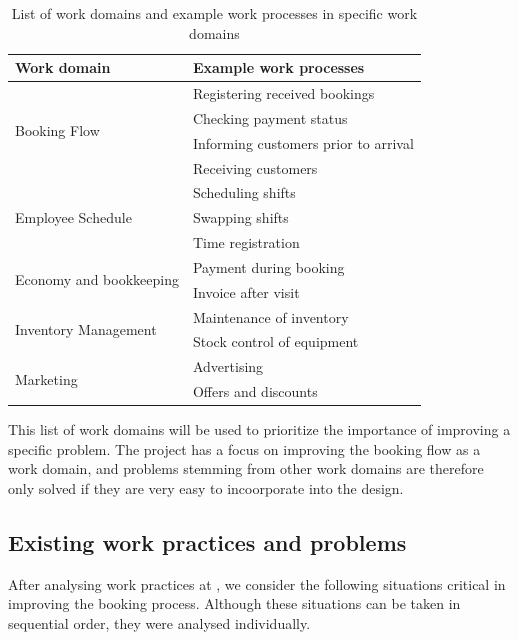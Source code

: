 \begin{table}[H]
    \centering
\begin{tabular}{ |l|l| }
        \hline
        Work domain & Example work processes \\ \hline
        \multirow{4}{*}{Booking Flow} 
            & Registering received bookings \\
            & Checking payment status \\
            & Informing customers prior to arrival \\
            & Receiving customers \\
        \hline
        \multirow{3}{*}{Employee Schedule} 
            & Scheduling shifts \\
            & Swapping shifts \\
            & Time registration \\
        \hline
        \multirow{2}{*}{Economy and bookkeeping} 
            & Payment during booking \\
            & Invoice after visit \\
        \hline
        \multirow{2}{*}{Inventory Management} 
            & Maintenance of inventory \\
            & Stock control of equipment \\
        \hline
        \multirow{2}{*}{Marketing} 
            & Advertising \\
            & Offers and discounts \\
        \hline
\end{tabular}
\caption{List of work domains and example work processes in specific work domains}
\label{table:workdomain}
\end{table}

This list of work domains will be used to prioritize the importance of 
improving a specific problem. The project has a focus on improving the booking flow 
as a work domain, and problems stemming from other work domains are therefore only 
solved if they are very easy to incoorporate into the design.


\subsection{Existing work practices and problems}
After analysing work practices at \gomonkey, we consider the following situations 
critical in improving the booking process. Although these situations can be taken
in sequential order, they were analysed individually.

